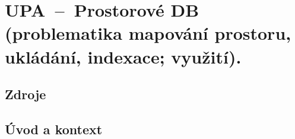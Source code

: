 

\graphicspath{{upa/prostorove_db/figures}}


\chapter{UPA~--~Prostorové DB (problematika mapování prostoru, ukládání, indexace; využití).}


\section{Zdroje}

\begin{compactitem}
    \item {}
    \item {}
    \item {}
    \item {}
\end{compactitem}


\section{Úvod a kontext}

